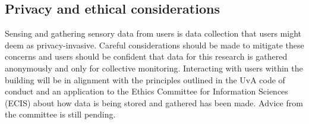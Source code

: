 \subsection{Privacy and ethical considerations}
Sensing and gathering sensory data from users is data collection that users might deem as privacy-invasive. Careful considerations should be made to mitigate these concerns and users should be confident that data for this research is gathered anonymously and only for collective monitoring. Interacting with users within the building will be in alignment with the principles outlined in the UvA code of conduct and an application to the Ethics Committee for Information Sciences (ECIS) about how data is being stored and gathered has been made. Advice from the committee is still pending.
